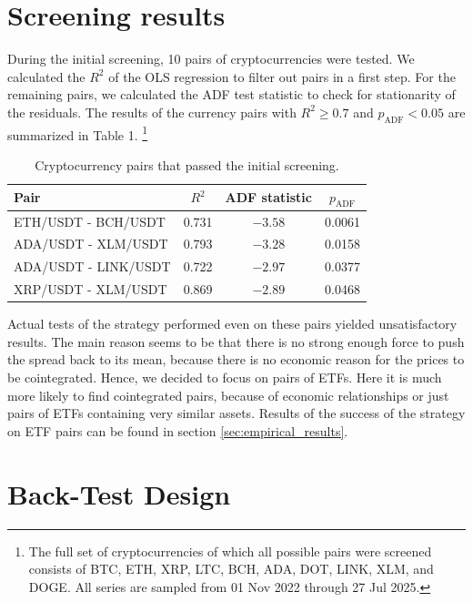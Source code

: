 \documentclass{article}
\begin{document}
\section{Screening results}
During the initial screening, 10 pairs of cryptocurrencies were tested. We calculated the $R^2$ of the OLS regression to filter out pairs in a first step. For the remaining pairs, we calculated the ADF test statistic to check for stationarity of the residuals. The results of the currency pairs with $R^2 \geq 0.7$ and $p_{\text{ADF}} < 0.05$ are summarized in Table 1. \footnote{The full set of cryptocurrencies of which all possible pairs were screened consists of BTC, ETH, XRP, LTC, BCH, ADA, DOT, LINK, XLM, and DOGE. All series are sampled from 01 Nov 2022 through 27 Jul 2025.}
\begin{table}[htbp]
\centering
\caption{Cryptocurrency pairs that passed the initial screening.}
\label{tab:crypto_screening}
    \begin{tabular}{lccc}
    \toprule
    Pair & $R^{2}$ & ADF statistic & $p_{\text{ADF}}$\\
    \midrule
    ETH/USDT - BCH/USDT  & 0.731 & $-3.58$ & 0.0061 \\
    ADA/USDT - XLM/USDT  & 0.793 & $-3.28$ & 0.0158 \\
    ADA/USDT - LINK/USDT & 0.722 & $-2.97$ & 0.0377 \\
    XRP/USDT - XLM/USDT  & 0.869 & $-2.89$ & 0.0468 \\
    \bottomrule
    \end{tabular}
\end{table}
Actual tests of the strategy performed even on these pairs yielded unsatisfactory results. The main reason seems to be that there is no strong enough force to push the spread back to its mean, because there is no economic reason for the prices to be cointegrated.
Hence, we decided to focus on pairs of ETFs. Here it is much more likely to find cointegrated pairs, because of economic relationships or just pairs of ETFs containing very similar assets. Results of the success of the strategy on ETF pairs can be found in section \ref{sec:empirical_results}.

\section{Back-Test Design}\label{sec:backtest}
\end{document}
